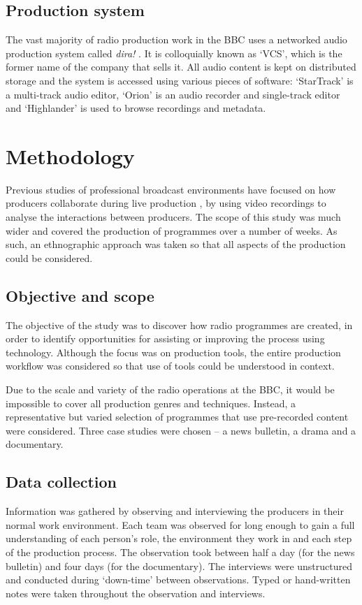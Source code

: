 \subsection{Production system}
The vast majority of radio production work in the BBC uses a networked audio
production system called \textit{dira!} \cite{SCISYS2015}. It is colloquially
known as `VCS', which is the former name of the company that sells it. All
audio content is kept on distributed storage and the system is accessed using
various pieces of software: `StarTrack' is a multi-track audio editor, `Orion'
is an audio recorder and single-track editor and `Highlander' is used to browse
recordings and metadata. 

\section{Methodology}\label{sec:method}
Previous studies of professional broadcast environments have focused on how
producers collaborate during live production \cite{Engstroem2010,Perry2009}, by
using video recordings to analyse the interactions between producers. The scope
of this study was much wider and covered the production of programmes over a
number of weeks. As such, an ethnographic approach was taken so that all
aspects of the production could be considered.

\subsection{Objective and scope}
The objective of the study was to discover how radio programmes are created, in
order to identify opportunities for assisting or improving the process using
technology. Although the focus was on production tools, the entire production
workflow was considered so that use of tools could be understood in context.

Due to the scale and variety of the radio operations at the BBC, it would be
impossible to cover all production genres and techniques.  Instead, a
representative but varied selection of programmes that use pre-recorded content
were considered. Three case studies were chosen --  a news bulletin, a drama
and a documentary.

\subsection{Data collection}
Information was gathered by observing and interviewing the producers in their
normal work environment. Each team was observed for long enough to gain a full
understanding of each person's role, the environment they work in and each step
of the production process. The observation took between half a day (for the
news bulletin) and four days (for the documentary). The interviews were
unstructured and conducted during `down-time' between observations.  Typed or
hand-written notes were taken throughout the observation and interviews.

